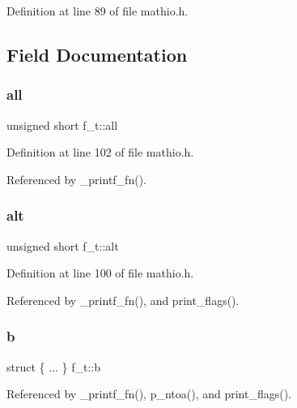 Definition at line 89 of file mathio.\+h.



\subsection{Field Documentation}
\mbox{\label{unionf__t_aab0615c9ada80b0f986b58639ea8c480}} 
\subsubsection{\texorpdfstring{all}{all}}
{\footnotesize\ttfamily unsigned short f\+\_\+t\+::all}



Definition at line 102 of file mathio.\+h.



Referenced by \+\_\+printf\+\_\+fn().

\mbox{\label{unionf__t_a907a8d8af4803c9a18bc0586d22d6881}} 
\subsubsection{\texorpdfstring{alt}{alt}}
{\footnotesize\ttfamily unsigned short f\+\_\+t\+::alt}



Definition at line 100 of file mathio.\+h.



Referenced by \+\_\+printf\+\_\+fn(), and print\+\_\+flags().

\mbox{\label{unionf__t_ab12d573627108be21a1ea9f5d5dae3c9}} 
\subsubsection{\texorpdfstring{b}{b}}
{\footnotesize\ttfamily struct \{ ... \}   f\+\_\+t\+::b}



Referenced by \+\_\+printf\+\_\+fn(), p\+\_\+ntoa(), and print\+\_\+flags().

\mbox{\label{unionf__t_a5f89cd6194ccc6a288f1fe31d39b2e64}} 
